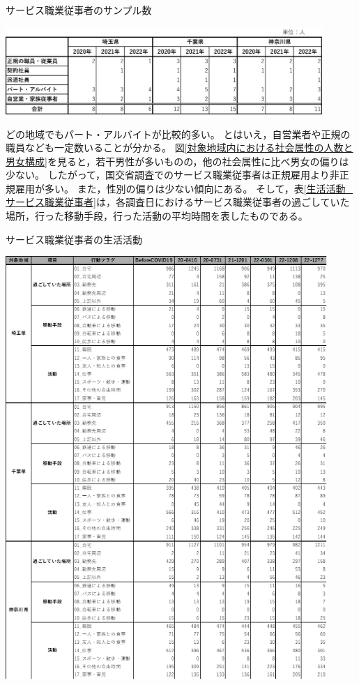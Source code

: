 \documentclass[paper={210mm,297mm},fontsize=15Q,line_length=35zw,number_of_lines=31,head_space=30mm,gutter=40mm,baselineskip=2.0zw,headfoot_verticalposition=1.5zw]{jlreq}
\begin{document}
\begin{table}[H]
  \centering
  \caption{サービス職業従事者のサンプル数}
  \includegraphics[width=120mm]{../Figure/c04s04_table_サービス職業従事者_サンプル数.png}
  \label{サンプル数_サービス職業従事者}
\end{table}

どの地域でもパート・アルバイトが比較的多い。
とはいえ，自営業者や正規の職員なども一定数いることが分かる。
図\ref{対象地域内における社会属性の人数と男女構成}を見ると，若干男性が多いものの，他の社会属性に比べ男女の偏りは少ない。
したがって，国交省調査でのサービス職業従事者は正規雇用より非正規雇用が多い。
また，性別の偏りは少ない傾向にある。
そして，表\ref{生活活動_サービス職業従事者}は，各調査日におけるサービス職業従事者の過ごしていた場所，行った移動手段，行った活動の平均時間を表したものである。

\begin{table}[H]
  \centering
  \caption{サービス職業従事者の生活活動}
  \includegraphics[width=122mm]{../Figure/c04s04_table_サービス職業従事者_生活活動.png}
  \label{生活活動_サービス職業従事者}
\end{table}
\end{document}
